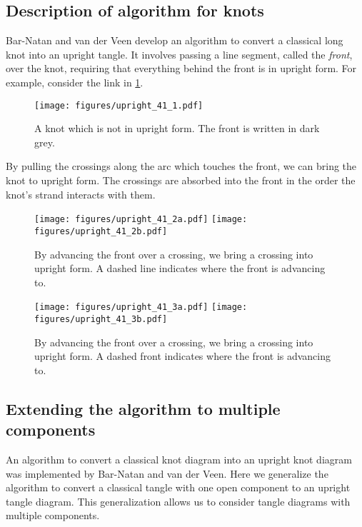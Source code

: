 
\subsection{Description of algorithm for knots}

Bar-Natan and van der Veen develop an algorithm to convert a classical long knot
into an upright tangle. It involves passing a line segment, called the
\emph{front}, over the knot, requiring that everything behind the front is in
upright form. For example, consider the link in \cref{fig:figures-upright_41_1}.
\begin{figure}[h]
        \centering
        \texttt{[image: figures/upright\_41\_1.pdf]}
        \caption{A knot which is not in upright form. The front is written in
        dark grey.}
        \label{fig:figures-upright_41_1}
\end{figure}
By pulling the crossings along the arc which touches the front, we can bring the
knot to upright form. The crossings are absorbed into the front in the order the
knot's strand interacts with them.
\begin{figure}[h]
        \centering
        \texttt{[image: figures/upright\_41\_2a.pdf]}
        \texttt{[image: figures/upright\_41\_2b.pdf]}
        \caption{By advancing the front over a crossing, we bring a crossing
        into upright form. A dashed line indicates where the front is advancing
        to.
        }
        \label{fig:figures-upright_41_2}
\end{figure}
\begin{figure}[h]
        \centering
        \texttt{[image: figures/upright\_41\_3a.pdf]}
        \texttt{[image: figures/upright\_41\_3b.pdf]}
        \caption{By advancing the front over a crossing, we bring a crossing
        into upright form. A dashed front indicates where the front is advancing
        to.
        }
        \label{fig:figures-upright_41_3}
\end{figure}

\subsection{Extending the algorithm to multiple components}

An algorithm to convert a classical knot diagram into an upright knot diagram
was implemented by Bar-Natan and van der Veen. Here we generalize the algorithm
to convert a classical tangle with one open component to an upright tangle
diagram. This generalization allows us to consider tangle diagrams with multiple
components.

